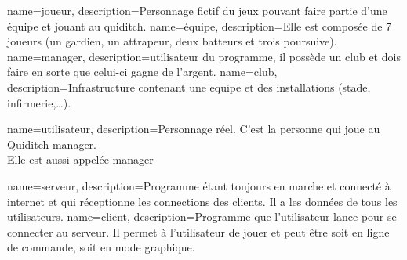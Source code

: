 {
    name=joueur,
    description={Personnage fictif du jeux pouvant faire partie d'une équipe et jouant au quiditch.}
}
{
    name=équipe,
    description={Elle est composée de 7 \glspl{joueur} (un gardien, un attrapeur, deux batteurs et trois poursuive).}
}
{
    name=manager,
    description={\Gls{utilisateur} du programme, il possède un \gls{club} et dois faire en sorte que celui-ci gagne de l'argent.}
}
{
    name=club,
    description={Infrastructure contenant une \gls{equipe} et des installations (stade, infirmerie,\ldots).}
}

{
    name=utilisateur,
    description={Personnage réel. C'est la personne qui joue au Quiditch manager.\\
    Elle est aussi appelée \gls{manager}}
}

{
    name=serveur,
    description={Programme étant toujours en marche et connecté à internet et qui réceptionne les connections des \glspl{client}. Il a les données de tous les \glspl{utilisateur}.}
}
{
    name=client,
    description={Programme que l'\gls{utilisateur} lance pour se connecter au \gls{serveur}. Il permet à l'\gls{utilisateur} de jouer et peut être soit en ligne de commande, soit en mode graphique.}
}


